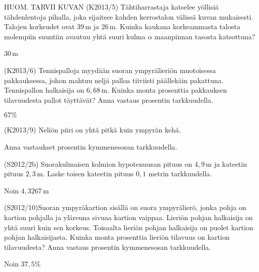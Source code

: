\begin{tehtava}
HUOM. TARVII KUVAN 
(K2013/5) Tähtiharrastaja katselee yöllisiä tähdenlentoja pihalla, joka sijaitsee kahden kerrostalon välissä kuvan mukaisesti. Talojen korkeudet ovat $39$\,m ja $26$\,m. Kuinka kaukana korkeammasta talosta molempiin suuntiin avautuu yhtä suuri kulma $\alpha$ maanpinnan tasosta katsottuna? 
  \begin{vastaus}
  $30$\,m
  \end{vastaus}
\end{tehtava}

\begin{tehtava}
(K2013/6) Tennispalloja myydään suoran ympyrälieriön muotoisessa pakkauksessa, johon mahtuu neljä palloa tiiviisti päällekäin pakattuna. Tennispallon halkaisija on $6,68$\,m. Kuinka monta prosenttia pakkauksen tilavuudesta pallot täyttävät? Anna vastaus prosentin tarkkuudella.
  \begin{vastaus}
  $67\%$
  \end{vastaus}
\end{tehtava}

\begin{tehtava}(K2013/9) Neliön piiri on yhtä pitkä kuin ympyrän kehä.
\begin{alakohdat}
Anna vastaukset prosentin kymmenesosan tarkkuudella.
 \end{alakohdat}
    \begin{vastaus}
    \begin{alakohdat}
   \end{alakohdat}
 \end{vastaus}
\end{tehtava}

\begin{tehtava}
(S2012/2b) Suorakulmaisen kolmion hypotenuusan pituus on $4,9$\,m ja kateetin pituus $2,3$\,m. Laske toisen kateetin pituus $0,1$ metrin tarkkuudella.
  \begin{vastaus}
  Noin $4,3267$\,m
  \end{vastaus}
\end{tehtava}

\begin{tehtava}
(S2012/10)Suoran ympyräkartion sisällä on suora ympyrälierö, jonka pohja on kartion pohjalla ja yläreuna sivuaa kartion vaippaa. Lieriön pohjan halkaisija on yhtä suuri kuin sen korkeus. Toisaalta lieriön pohjan halkaisija on puolet kartion pohjan halkaisijasta. Kuinka monta prosenttia lieriön tilavuus on kartion tilavuudesta? Anna vastaus prosentin kymmenesosan tarkkuudella.
  \begin{vastaus}
  Noin $37,5\%$
  \end{vastaus}
\end{tehtava}

